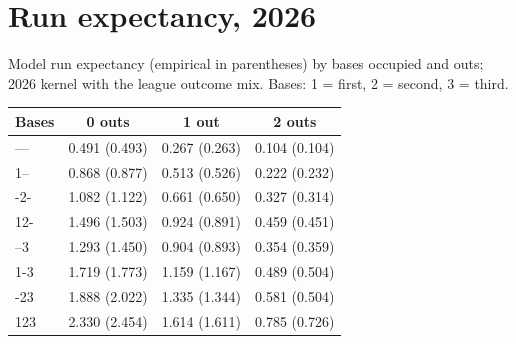 \section{Run expectancy, 2026}\label{app:re24}
Model run expectancy (empirical in parentheses) by bases occupied and outs; 2026 kernel with the league outcome mix. Bases: 1 = first, 2 = second, 3 = third.

\begin{center}\small\begin{tabular}{lccc}\toprule
Bases & 0 outs & 1 out & 2 outs\\ \midrule
--- & 0.491 (0.493) & 0.267 (0.263) & 0.104 (0.104) \\
1-- & 0.868 (0.877) & 0.513 (0.526) & 0.222 (0.232) \\
-2- & 1.082 (1.122) & 0.661 (0.650) & 0.327 (0.314) \\
12- & 1.496 (1.503) & 0.924 (0.891) & 0.459 (0.451) \\
--3 & 1.293 (1.450) & 0.904 (0.893) & 0.354 (0.359) \\
1-3 & 1.719 (1.773) & 1.159 (1.167) & 0.489 (0.504) \\
-23 & 1.888 (2.022) & 1.335 (1.344) & 0.581 (0.504) \\
123 & 2.330 (2.454) & 1.614 (1.611) & 0.785 (0.726) \\
\bottomrule\end{tabular}\end{center}
